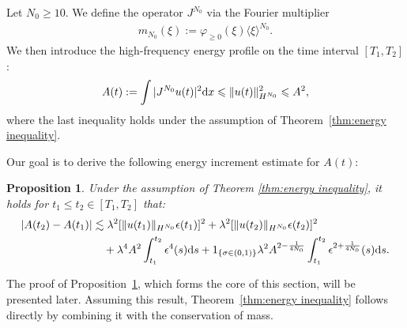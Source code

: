 \documentclass[UTF-8,reqno]{amsart}
\numberwithin{equation}{section}
\newtheorem{proposition}[theorem]{Proposition}
\theoremstyle{definition}
\def\dif{{\mathord{{\rm d}}}}
\def\geq{\geqslant}
\def\leq{\leqslant}
\def\dif{{\mathord{{\rm d}}}}
\def\geq{\geqslant}
\def\leq{\leqslant}
\begin{document}
Let $N_0\geq 10$. We define the operator $J^{N_0}$ via the Fourier multiplier
\begin{align*}
    m_{N_0}(\xi):=\varphi_{\geq 0}(\xi)\langle\xi\rangle^{N_0}.
\end{align*}
We then introduce the high-frequency energy profile on the time interval $[T_1,T_2]$:
\begin{align*}
    A(t):=\int |J^{N_0}u(t)|^2\dif x\leq \|u(t)\|_{H^{N_0}}^2\leq A^2,
\end{align*}
where the last inequality holds under the assumption of 
Theorem~\ref{thm:energy inequality}.  

Our goal is to derive the following energy increment estimate for $A(t)$:
 \begin{proposition}\label{prop:highenergy} 
Under the assumption of Theorem \ref{thm:energy inequality}, it holds for $t_1\leq t_2\in[T_1,T_2]$ that: 
     \begin{align*}
  |   A(t_2)-A(t_1)|&\lesssim\lambda^2[\|u(t_1)\|_{H^{N_0}}\epsilon(t_1)]^2+\lambda^2[\|u(t_2)\|_{H^{N_0}}\epsilon(t_2)]^2\\
  &\quad+\lambda^4A^2\int_{t_1}^{t_2}\epsilon^4(s)\dif s+1_{\{\sigma\in(0,1)\}}\lambda^2A^{2-\frac{1}{4N_0}}\int_{t_1}^{t_2}\epsilon^{2+\frac{1}{4N_0}}(s)\dif s.
\end{align*}
 \end{proposition}

The proof of Proposition~\ref{prop:highenergy}, which forms the core of this section, will be presented later. 
Assuming this result, Theorem~\ref{thm:energy inequality} follows directly by combining it with the conservation of mass. 
\end{document}
